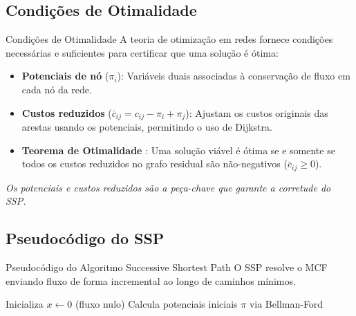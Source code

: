 \subsection{Condições de Otimalidade}
\begin{frame}{Condições de Otimalidade}
  A teoria de otimização em redes fornece condições necessárias e suficientes para certificar que uma solução é ótima:

  \begin{itemize}
    \setlength{\itemsep}{10pt}
    \item \textbf{Potenciais de nó} ($\pi_i$): Variáveis duais associadas à conservação de fluxo em cada nó da rede.
    \item \textbf{Custos reduzidos} ($\bar{c}_{ij} = c_{ij} - \pi_i + \pi_j$): Ajustam os custos originais das arestas usando os potenciais, permitindo o uso de Dijkstra.
    \item \textbf{Teorema de Otimalidade} \cite{ahuja1993network}: Uma solução viável é ótima se e somente se todos os custos reduzidos no grafo residual são não-negativos ($\bar{c}_{ij} \geq 0$).
  \end{itemize}

  \begin{center}
    \scriptsize \textit{Os potenciais e custos reduzidos são a peça-chave que garante a corretude do SSP.}
  \end{center}
\end{frame}

\subsection{Pseudocódigo do SSP}
\begin{frame}[shrink=20]{Pseudocódigo do Algoritmo Successive Shortest Path}
  O SSP resolve o MCF enviando fluxo de forma incremental ao longo de caminhos mínimos.
  
  \vspace{0.1cm}
  \SetAlFnt{\footnotesize}
  \SetAlCapFnt{\footnotesize}
  \begin{algorithm}[H]
    \caption{Successive Shortest Path}
    \SetAlgoLined
    Inicializa $x \leftarrow 0$ (fluxo nulo)\;
    Calcula potenciais iniciais $\pi$ via Bellman-Ford\;
    \;
  \end{algorithm}
\end{frame}

